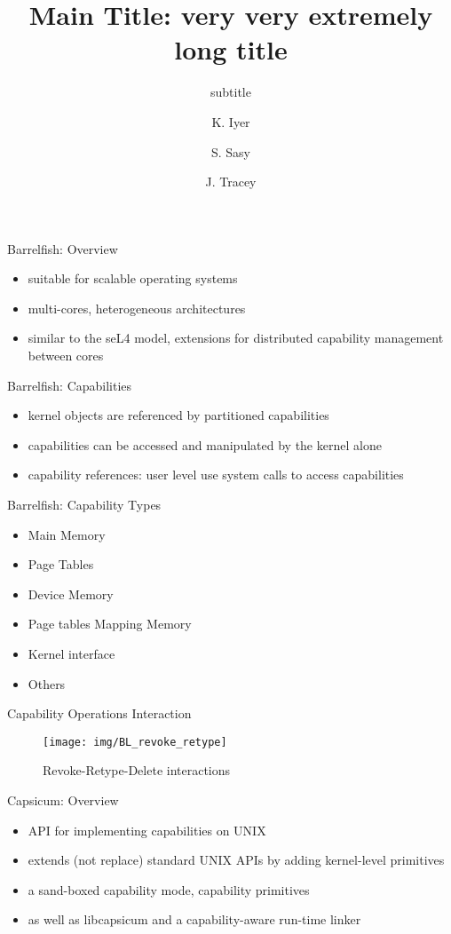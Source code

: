 \documentclass[11pt]{beamer}
\title[Main Title]{Main Title: very very extremely long title}
\subtitle{subtitle}
\author[k4iyer, ssasy, j3tracey]{K. Iyer \and S. Sasy \and J. Tracey}
\institute[]{Cheriton School of Computer Science}
\date{}
\begin{document}
\begin{frame}
  \titlepage
\end{frame}

\begin{frame}{Barrelfish: Overview}
	\begin{itemize}
	\item suitable for scalable operating systems 
	\item multi-cores, heterogeneous architectures
	\item similar to the seL4 model, extensions for distributed capability management between cores
	\end{itemize}
\end{frame}


\begin{frame}{Barrelfish: Capabilities}
	\begin{itemize}
	\item kernel objects are referenced by partitioned capabilities
	\item capabilities can be accessed and manipulated by the kernel alone
	\item capability references: user level use system calls to access capabilities
	\end{itemize}
\end{frame}

\begin{frame}{Barrelfish: Capability Types}
\begin{itemize}
\item Main Memory
\item Page Tables 
\item Device Memory
\item Page tables Mapping Memory 
\item Kernel interface
\item Others
\end{itemize}
\end{frame}


\begin{frame}{Capability Operations Interaction}
\begin{figure}
		  \texttt{[image: img/BL\_revoke\_retype]}
		  \caption{Revoke-Retype-Delete interactions}
		  
    \end{figure}   
\end{frame}

\begin{frame}{Capsicum: Overview}
	\begin{itemize}
	\item API for implementing capabilities on UNIX 
	\item extends (not replace) standard UNIX APIs by adding kernel-level primitives
	\item a sand-boxed capability mode, capability primitives 
	\item as well as libcapsicum and a capability-aware run-time linker
	\end{itemize}
\end{frame}
\end{document}
